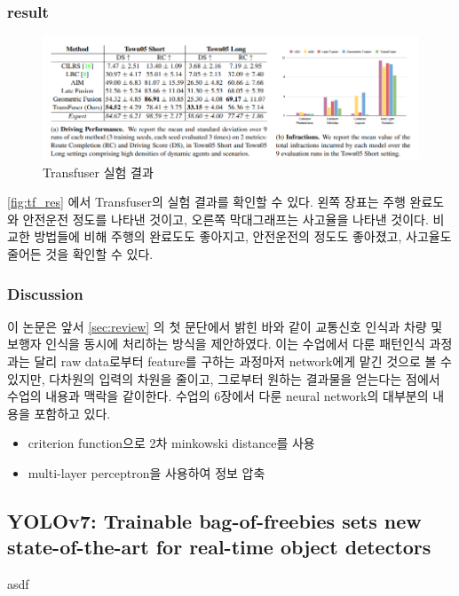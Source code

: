 \subsubsection{result}
\begin{figure}[htp]
    \centering
    \includegraphics[width=\linewidth]{figures/Transfuser_result.png}
    \caption{Transfuser 실험 결과}
    \label{fig:tf_res}
\end{figure}
\autoref{fig:tf_res} 에서 Transfuser의 실험 결과를 확인할 수 있다.
왼쪽 장표는 주행 완료도와 안전운전 정도를 나타낸 것이고,
오른쪽 막대그래프는 사고율을 나타낸 것이다.
비교한 방법들에 비해 주행의 완료도도 좋아지고,
안전운전의 정도도 좋아졌고,
사고율도 줄어든 것을 확인할 수 있다.

\subsubsection{Discussion}
이 논문은 앞서 \autoref{sec:review} 의 첫 문단에서 밝힌 바와 같이
교통신호 인식과 차량 및 보행자 인식을 동시에 처리하는 방식을 제안하였다.
이는 수업에서 다룬 패턴인식 과정과는 달리 raw data로부터 feature를 구하는 과정마저
network에게 맡긴 것으로 볼 수 있지만, 다차원의 입력의 차원을 줄이고,
그로부터 원하는 결과물을 얻는다는 점에서 수업의 내용과 맥락을 같이한다.
수업의 6장에서 다룬 neural network의 대부분의 내용을 포함하고 있다.
\begin{itemize}\tightlist
    \item criterion function으로 2차 minkowski distance를 사용
    \item multi-layer perceptron을 사용하여 정보 압축
\end{itemize}


\subsection{YOLOv7: Trainable bag-of-freebies sets new state-of-the-art for real-time object detectors}{\label{subsec:yolov7}}

asdf